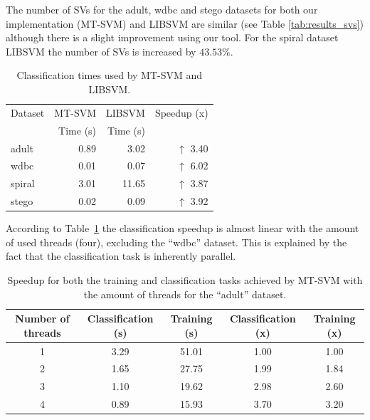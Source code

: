 \documentclass{llncs}
\begin{document}
The number of SVs for the adult, wdbc and stego datasets for both our implementation (MT-SVM)  and LIBSVM are similar (see Table \ref{tab:results_svs}) although there is a slight improvement using our tool. For the spiral dataset LIBSVM the number of SVs is increased by $43.53 \%$.
\begin{table}[!ht]
  \centering
  \caption{Classification times used by MT-SVM and LIBSVM.}
    \begin{tabular}{|l|r|r|r|} \hline
    Dataset & MT-SVM & LIBSVM & Speedup (x) \\
          & Time (s) & Time (s) &  \\ \hline\hline
    adult & 0.89  & 3.02  & $\uparrow$ 3.40 \\
    wdbc  & 0.01  & 0.07  & $\uparrow$ 6.02 \\ 
    spiral & 3.01  & 11.65 & $\uparrow$ 3.87 \\ \hline
	stego & 0.02 & 0.09 & $\uparrow$ 3.92 \\ \hline
    \end{tabular}
  \label{tab:results_classification}
\end{table}

According to Table~\ref{tab:results_classification} the classification speedup is almost linear with the amount of used threads (four), excluding the ``wdbc'' dataset. This is explained by the fact that the classification task is inherently parallel.

\begin{table}[!ht]
  \centering
  \caption{Speedup for both the training and classification tasks achieved by MT-SVM with the amount of threads for the ``adult'' dataset.}
    \begin{tabular}{|c|c|c|c|c|} \hline
    Number of threads & Classification (s) & Training (s) & Classification (x) & Training (x) \\ \hline
    1     & 3.29  & 51.01 & 1.00  & 1.00 \\ \hline
    2     & 1.65  & 27.75 & 1.99  & 1.84 \\ \hline
    3     & 1.10  & 19.62 & 2.98  & 2.60 \\ \hline
    4     & 0.89  & 15.93 & 3.70  & 3.20 \\ \hline
    \end{tabular}
  \label{tab:results_speedup_vs_cores}
\end{table}%
\end{document}
